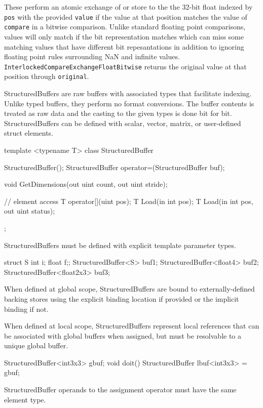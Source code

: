 These perform an atomic exchange of or store to the the 32-bit float indexed by \texttt{pos}
with the provided \texttt{value} if the value at that position matches the value of \texttt{compare}
in a bitwise comparison.
Unlike standard floating point comparisons, values will only match if the bit representation matches
which can miss some matching values that have different bit repesantations in addition to ignoring
floating point rules surrounding NaN and infinite values.
\texttt{InterlockedCompareExchangeFloatBitwise} returns the original value at that position through \texttt{original}.


StructuredBuffers are raw buffers with associated types that facilitate indexing.
Unlike typed buffers, they perform no format conversions.
The buffer contents is treated as raw data and the casting to the given types is done bit for bit.
StructuredBuffers can be defined with scalar, vector, matrix, or user-defined struct elements.


\begin{HLSL}
template <typename T>
 class StructuredBuffer {
   StructuredBuffer();
   StructuredBuffer operator=(StructuredBuffer buf);

   void GetDimensions(out uint count, out uint stride);

   // element access
   T operator[](uint pos);
   T Load(in int pos);
   T Load(in int pos, out uint status);
};
\end{HLSL}


StructuredBuffers must be defined with explicit template parameter types.
\begin{HLSL}
  struct S {int i; float f;};
  StructuredBuffer<S> buf1;
  StructuredBuffer<float4> buf2;
  StructuredBuffer<float2x3> buf3;
\end{HLSL}

When defined at global scope, StructuredBuffers are bound to externally-defined backing stores
using the explicit binding location if provided or the implicit binding if not.

When defined at local scope, StructuredBuffers represent local references
that can be associated with global buffers when assigned,
but must be resolvable to a unique global buffer.

\begin{HLSL}
  StructuredBuffer<int3x3> gbuf;
  void doit() {
    StructuredBuffer lbuf<int3x3> = gbuf;
  }
\end{HLSL}
StructuredBuffer operands to the assignment operator must have the same element type.

